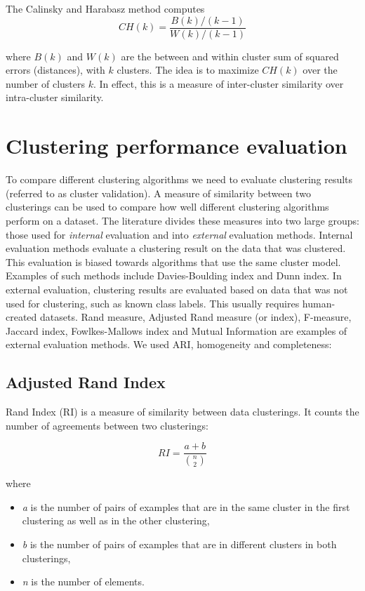 \documentclass[conference]{IEEEtran}
\begin{document}
The Calinsky and Harabasz method computes
\begin{equation}
\label{calinsky}
CH(k) = \frac{B(k)/(k-1)}{W(k)/(k-1)}
\end{equation}

where $B(k)$ and $W(k)$ are the between and within cluster sum of squared errors (distances),
with $k$ clusters. The idea is to maximize $CH(k)$ over the number of clusters $k$. In effect, this
is a measure of inter-cluster similarity over intra-cluster similarity.

\section{Clustering performance evaluation}
To compare different clustering algorithms we need to evaluate clustering results (referred to as cluster validation).
A measure of similarity between two clusterings can be used to compare how well different clustering algorithms perform
on a dataset. The literature divides these measures into two large groups: those used for \textit{internal} evaluation
and into \textit{external} evaluation methods. Internal evaluation methods evaluate a clustering result on the data
that was clustered. This evaluation is biased towards algorithms that use the same cluster model. Examples of such methods
include Davies-Boulding index and Dunn index. In external evaluation, clustering results are evaluated based on data
that was not used for clustering, such as known class labels. This usually requires human-created datasets. Rand measure,
Adjusted Rand measure (or index), F-measure, Jaccard index, Fowlkes-Mallows index and Mutual Information are examples
of external evaluation methods. We used ARI, homogeneity and completeness:

\subsection{Adjusted Rand Index}
Rand Index (RI) is a measure of similarity between data clusterings. It counts
the number of agreements between two clusterings:

\begin{equation}
\label{RI}
RI = \frac{a+b}{{n \choose 2}}
\end{equation}

where
\begin{itemize}
    \item \textit{a} is the number of pairs of examples that are in the same cluster in the first clustering
    as well as in the other clustering,
    \item \textit{b} is the number of pairs of examples that are in different clusters in both clusterings,
    \item \textit{n} is the number of elements.
\end{itemize}
\end{document}
